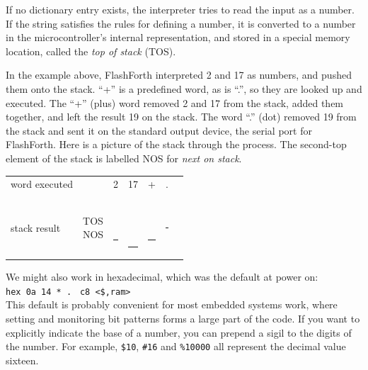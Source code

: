 \documentclass[12pt,a4paper]{article}
\begin{document}
\medskip
If no dictionary entry exists, the interpreter tries to read the input as a number.  
If the string satisfies the rules for defining a number, it is converted to a number
in the microcontroller's internal representation, and stored in a special memory location,
called the \textit{top of stack} (TOS).

\medskip
In the example above, FlashForth interpreted 2 and 17 as numbers, and pushed them onto the stack.
``+'' is a predefined word, as is ``.'', so they are looked up and executed.
The ``+'' (plus) word removed 2 and 17 from the stack, added them together, 
and left the result 19 on the stack. 
The word ``.'' (dot) removed 19 from the stack and sent it on the standard output device,
the serial port for FlashForth.
Here is a picture of the stack through the process.
The second-top element of the stack is labelled NOS for \textit{next on stack}.
\begin{center}
 \begin{tabular}{lc|ccccc}
 word executed & & 2 & 17 & + & . \\
 \\
 stack result  
 & \parbox[t]{35pt}{TOS \\ NOS} 
 & \parbox[t]{25pt}{ \\ \rule{20pt}{2pt}} 
 & \parbox[t]{25pt}{ \\  \\ \rule{20pt}{2pt}}
 & \parbox[t]{25pt}{ \\ \rule{20pt}{2pt}}
 & \parbox[t]{25pt}{\rule{20pt}{2pt}} \\
 \end{tabular}
\end{center}


\medskip
We might also work in hexadecimal, which was the default at power on: \vspace{7pt} \\
\verb!hex 0a 14 * .! \fbox{$\hookleftarrow$} \verb! c8 <$,ram>! \vspace{7pt} \\
This default is probably convenient for most embedded systems work,
where setting and monitoring bit patterns forms a large part of the code.
If you want to explicitly indicate the base of a number, you can prepend a sigil to the
digits of the number.
For example, \verb!$10!, \verb!#16! and \verb!%10000! all represent the decimal value sixteen.
\end{document}

